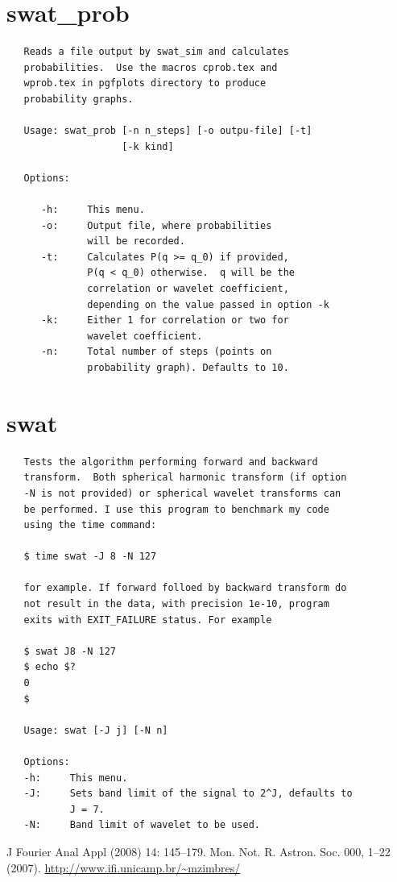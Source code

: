 \documentclass[12pt]{article}
\begin{document}
\section{swat\_prob}
{\bf \color{brown}
   \begin{lstlisting}
   Reads a file output by swat_sim and calculates
   probabilities.  Use the macros cprob.tex and
   wprob.tex in pgfplots directory to produce
   probability graphs.

   Usage: swat_prob [-n n_steps] [-o outpu-file] [-t] 
                    [-k kind]

   Options:

      -h:     This menu.
      -o:     Output file, where probabilities
              will be recorded.
      -t:     Calculates P(q >= q_0) if provided,
              P(q < q_0) otherwise.  q will be the
              correlation or wavelet coefficient,
              depending on the value passed in option -k
      -k:     Either 1 for correlation or two for
              wavelet coefficient.
      -n:     Total number of steps (points on
              probability graph). Defaults to 10.

   \end{lstlisting}
}

\section{swat}
{\bf \color{brown}
   \begin{lstlisting}
   Tests the algorithm performing forward and backward
   transform.  Both spherical harmonic transform (if option
   -N is not provided) or spherical wavelet transforms can
   be performed. I use this program to benchmark my code
   using the time command:
   
   $ time swat -J 8 -N 127
   
   for example. If forward folloed by backward transform do
   not result in the data, with precision 1e-10, program
   exits with EXIT_FAILURE status. For example
   
   $ swat J8 -N 127
   $ echo $?
   0
   $
   
   Usage: swat [-J j] [-N n]

   Options: 
   -h:     This menu.
   -J:     Sets band limit of the signal to 2^J, defaults to
           J = 7.
   -N:     Band limit of wavelet to be used.

   \end{lstlisting}
}

\begin{thebibliography}{99}
 J Fourier Anal Appl (2008) 14: 145–179.
 Mon. Not. R. Astron. Soc. 000, 1–22 (2007). 
 \url{http://www.ifi.unicamp.br/~mzimbres/}
\end{thebibliography}
\end{document}
